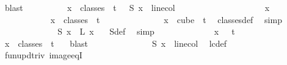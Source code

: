 \begin{isabellebody}
\ blast\isanewline
\isanewline
\ \ \ \ \ \ \ \ \isamarkupfalse%
\ {\isachardoublequoteopen}{\isasymforall}x\ {\isasymin}\ classes\ {}\ t\ {}{\isachardot}{\kern0pt}\ {\isasymchi}\ {\isacharparenleft}{\kern0pt}S{}\ x{\isacharparenright}{\kern0pt}\ {\isacharequal}{\kern0pt}\ linecol{\isachardoublequoteclose}\isanewline
\ \ \ \ \ \ \ \ \isamarkupfalse%
\isanewline
\ \ \ \ \ \ \ \ \ \ \isamarkupfalse%
\ x\isanewline
\ \ \ \ \ \ \ \ \ \ \isamarkupfalse%
\ {\isachardoublequoteopen}x\ {\isasymin}\ classes\ {}\ t\ {}{\isachardoublequoteclose}\isanewline
\ \ \ \ \ \ \ \ \ \ \isamarkupfalse%
\ \isamarkupfalse%
\ {\isachardoublequoteopen}x\ {\isasymin}\ cube\ {}\ {\isacharparenleft}{\kern0pt}t{\isacharplus}{\kern0pt}{}{\isacharparenright}{\kern0pt}{\isachardoublequoteclose}\ \isamarkupfalse%
\ classes{\isacharunderscore}{\kern0pt}def\ \isamarkupfalse%
\ simp\isanewline
\ \ \ \ \ \ \ \ \ \ \isamarkupfalse%
\ \isamarkupfalse%
\ {\isachardoublequoteopen}S{}\ x\ {\isacharequal}{\kern0pt}\ L{\isacharprime}{\kern0pt}\ {\isacharparenleft}{\kern0pt}x\ {}{\isacharparenright}{\kern0pt}{\isachardoublequoteclose}\ \isamarkupfalse%
\ S{}{\isacharunderscore}{\kern0pt}def\ \isamarkupfalse%
\ simp\isanewline
\ \ \ \ \ \ \ \ \ \ \isamarkupfalse%
\ \isamarkupfalse%
\ {\isachardoublequoteopen}x\ {}\ {\isasymin}\ {\isacharbraceleft}{\kern0pt}{\isachardot}{\kern0pt}{\isachardot}{\kern0pt}{\isacharless}{\kern0pt}t{\isacharbraceright}{\kern0pt}{\isachardoublequoteclose}\ \isamarkupfalse%
\ {\isacharasterisk}{\kern0pt}{\isacharasterisk}{\kern0pt}\ \isamarkupfalse%
\ {\isacartoucheopen}x\ {\isasymin}\ classes\ {}\ t\ {}{\isacartoucheclose}\ \isamarkupfalse%
\ blast\isanewline
\ \ \ \ \ \ \ \ \ \ \isamarkupfalse%
\ \isamarkupfalse%
\ {\isachardoublequoteopen}{\isasymchi}\ {\isacharparenleft}{\kern0pt}S{}\ x{\isacharparenright}{\kern0pt}\ {\isacharequal}{\kern0pt}\ linecol{\isachardoublequoteclose}\ \isamarkupfalse%
\ lc{\isacharunderscore}{\kern0pt}def\ \isanewline
\ \ \ \ \ \ \ \ \ \ \ \ \isamarkupfalse%
\ fun{\isacharunderscore}{\kern0pt}upd{\isacharunderscore}{\kern0pt}triv\ image{\isacharunderscore}{\kern0pt}eqI\ \isamarkupfalse%

\end{isabellebody}
